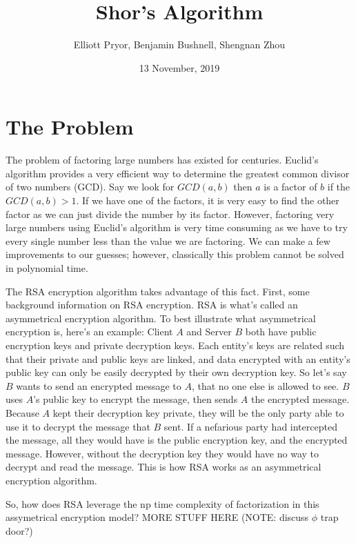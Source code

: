 \documentclass[a4paper]{article}
\title{Shor's Algorithm}
\author{Elliott Pryor, Benjamin Bushnell, Shengnan Zhou}
\date{13 November, 2019}
\begin{document}
\maketitle %
\section{The Problem}
The problem of factoring large numbers has existed for centuries. Euclid's algorithm provides a very efficient way to determine the greatest common divisor of two numbers (GCD). Say we look for $GCD(a,b)$ then $a$ is a factor of $b$ if the $GCD(a, b) > 1$. If we have one of the factors, it is very easy to find the other factor as we can just divide the number by its factor. However, factoring very large numbers using Euclid's algorithm is very time consuming as we have to try every single number less than the value we are factoring. We can make a few improvements to our guesses; however, classically this problem cannot be solved in polynomial time.

The RSA encryption algorithm takes advantage of this fact. First, some background information on RSA encryption. RSA is what's called an asymmetrical encryption algorithm. To best illustrate what asymmetrical encryption is, here's an example: Client $A$ and Server $B$ both have public encryption keys and private decryption keys. Each entity's keys are related such that their private and public keys are linked, and data encrypted with an entity's public key can only be easily decrypted by their own decryption key. So let's say $B$ wants to send an encrypted message to $A$, that no one else is allowed to see. $B$ uses $A$'s public key to encrypt the message, then sends $A$ the encrypted message. Because $A$ kept their decryption key private, they will be the only party able to use it to decrypt the message that $B$ sent. If a nefarious party had intercepted the message, all they would have is the public encryption key, and the encrypted message. However, without the decryption key they would have no way to decrypt and read the message. This is how RSA works as an asymmetrical encryption algorithm.

So, how does RSA leverage the np time complexity of factorization in this assymetrical encryption model? MORE STUFF HERE (NOTE: discuss $\phi$ trap door?)
\end{document}
